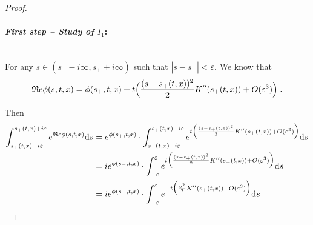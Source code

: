 \documentclass[11pt]{amsart}
\renewcommand{\Re}{\mathfrak{R}e}
\begin{document}
\begin{proof}
\paragraph{\textit{First step -- Study of $I_1$}:}\mbox{}\\
For any $s \in (s_+ - i \infty, s_+ + i \infty)$ such that $|s - s_+| < \varepsilon$.
We know that 
    \begin{equation}
        \Re \phi(s, t, x) = \phi(s_+, t, x) + t \Big(\frac{(s - s_+(t,x))^2}{2} K''(s_+(t,x)) + O(\varepsilon^3)\Big)
        \eqfinp
    \end{equation}

Then 
\begin{align*}
   \int_{s_+(t,x) - i\varepsilon}^{s_+(t,x) + i\varepsilon} e^{\Re \phi(s,t,x)} \ds
    &=
    e^{\phi(s_+, t, x)} \cdot \int_{s_+(t,x) - i\varepsilon}^{s_+(t,x) + i\varepsilon} e^{t \Big(\frac{(s - s_+(t,x))^2}{2} K''(s_+(t,x)) + O(\varepsilon^3)\Big)} \ds \\
    &= 
     i e^{\phi(s_+, t, x)} \cdot \int_{- \varepsilon}^{\varepsilon} e^{t \Big(\frac{(s - s_+(t,x))^2}{2} K''(s_+(t,x)) + O(\varepsilon^3)\Big)} \ds \\
    &= 
     i e^{\phi(s_+, t, x)} \cdot \int_{- \varepsilon}^{\varepsilon} e^{- t \Big(\frac{v^2}{2} K''(s_+(t,x)) + O(\varepsilon^3)\Big)} \ds 
\end{align*}


\end{proof}
\end{document}

